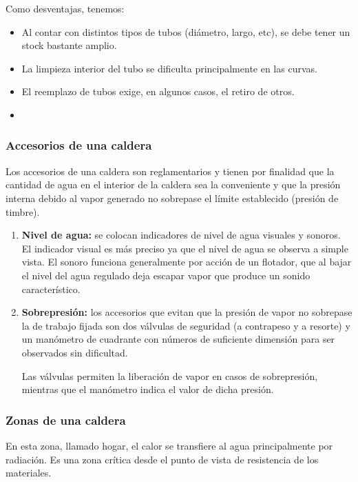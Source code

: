 \begin{enumerate}[label=\alph*)]
	 Como desventajas, tenemos:
	 \begin{itemize}
	 	\item Al contar con distintos tipos de tubos (diámetro, largo, etc), se debe tener un stock bastante amplio.
	 	\item La limpieza interior del tubo se dificulta principalmente en las curvas.
	 	\item El reemplazo de tubos exige, en algunos casos, el retiro de otros.
	 	\item 
	 \end{itemize}
\end{enumerate}

\subsubsection{Accesorios de una caldera}

Los accesorios de una caldera son reglamentarios y tienen
por finalidad que la cantidad de agua en el interior de la caldera sea la conveniente y que la presión interna debido al vapor generado no sobrepase el límite establecido (presión de timbre).

\begin{enumerate}[label=\alph*)]
	\item \textbf{Nivel de agua:} se colocan indicadores de nivel de agua visuales y sonoros. El indicador visual es más preciso ya que el nivel de agua se observa a simple vista. El sonoro funciona generalmente por acción de un flotador, que al bajar el nivel del agua regulado deja escapar vapor que produce un sonido característico.
	\item \textbf{Sobrepresión:} los accesorios que evitan que la presión de vapor no sobrepase la de trabajo fijada son dos válvulas de seguridad (a contrapeso y a resorte) y un manómetro de cuadrante con números de suficiente dimensión para ser observados sin dificultad.
	
	Las válvulas permiten la liberación de vapor en casos de sobrepresión, mientras que el manómetro indica el valor de dicha presión.
\end{enumerate}


\subsubsection{Zonas de una caldera}


En esta zona, llamado hogar, el calor se transfiere al agua principalmente por radiación. Es una zona crítica desde el punto de vista de resistencia de los materiales. 

